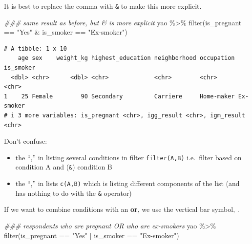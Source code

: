 \documentclass[
  letterpaper,
  DIV=11,
  numbers=noendperiod]{scrreprt}
\newenvironment{Shaded}{\begin{snugshade}}{\end{snugshade}}
\newcommand{\DocumentationTok}[1]{\textcolor[rgb]{0.37,0.37,0.37}{\textit{#1}}}
\newcommand{\FunctionTok}[1]{\textcolor[rgb]{0.28,0.35,0.67}{#1}}
\newcommand{\NormalTok}[1]{\textcolor[rgb]{0.00,0.23,0.31}{#1}}
\newcommand{\SpecialCharTok}[1]{\textcolor[rgb]{0.37,0.37,0.37}{#1}}
\newcommand{\StringTok}[1]{\textcolor[rgb]{0.13,0.47,0.30}{#1}}
\begin{document}
It is best to replace the comma with \texttt{\&} to make this more
explicit.

\begin{Shaded}
\begin{Highlighting}[]
\DocumentationTok{\#\#\# same result as before, but \textasciigrave{}\&\textasciigrave{} is more explicit}
\NormalTok{yao }\SpecialCharTok{\%\textgreater{}\%} \FunctionTok{filter}\NormalTok{(is\_pregnant }\SpecialCharTok{==} \StringTok{"Yes"} \SpecialCharTok{\&}\NormalTok{ is\_smoker }\SpecialCharTok{==} \StringTok{"Ex{-}smoker"}\NormalTok{)}
\end{Highlighting}
\end{Shaded}

\begin{verbatim}
# A tibble: 1 x 10
    age sex    weight_kg highest_education neighborhood occupation is_smoker
  <dbl> <chr>      <dbl> <chr>             <chr>        <chr>      <chr>    
1    25 Female        90 Secondary         Carriere     Home-maker Ex-smoker
# i 3 more variables: is_pregnant <chr>, igg_result <chr>, igm_result <chr>
\end{verbatim}

\begin{tcolorbox}[enhanced jigsaw, titlerule=0mm, colback=white, left=2mm, breakable, opacitybacktitle=0.6, colbacktitle=quarto-callout-note-color!10!white, colframe=quarto-callout-note-color-frame, bottomtitle=1mm, opacityback=0, coltitle=black, arc=.35mm, toptitle=1mm, title=\textcolor{quarto-callout-note-color}{\faInfo}\hspace{0.5em}{Side Note}, leftrule=.75mm, toprule=.15mm, bottomrule=.15mm, rightrule=.15mm]

Don't confuse:

\begin{itemize}
\item
  the ``,'' in listing several conditions in filter \texttt{filter(A,B)}
  i.e.~filter based on condition A and (\texttt{\&}) condition B
\item
  the ``,'' in lists \texttt{c(A,B)} which is listing different
  components of the list (and has nothing to do with the \texttt{\&}
  operator)
\end{itemize}

\end{tcolorbox}

If we want to combine conditions with an \textbf{or}, we use the
vertical bar symbol, \texttt{\textbar{}}.

\begin{Shaded}
\begin{Highlighting}[]
\DocumentationTok{\#\#\# respondents who are pregnant OR who are ex{-}smokers}
\NormalTok{yao }\SpecialCharTok{\%\textgreater{}\%} \FunctionTok{filter}\NormalTok{(is\_pregnant }\SpecialCharTok{==} \StringTok{"Yes"} \SpecialCharTok{|}\NormalTok{ is\_smoker }\SpecialCharTok{==} \StringTok{"Ex{-}smoker"}\NormalTok{)}
\end{Highlighting}
\end{Shaded}
\end{document}

